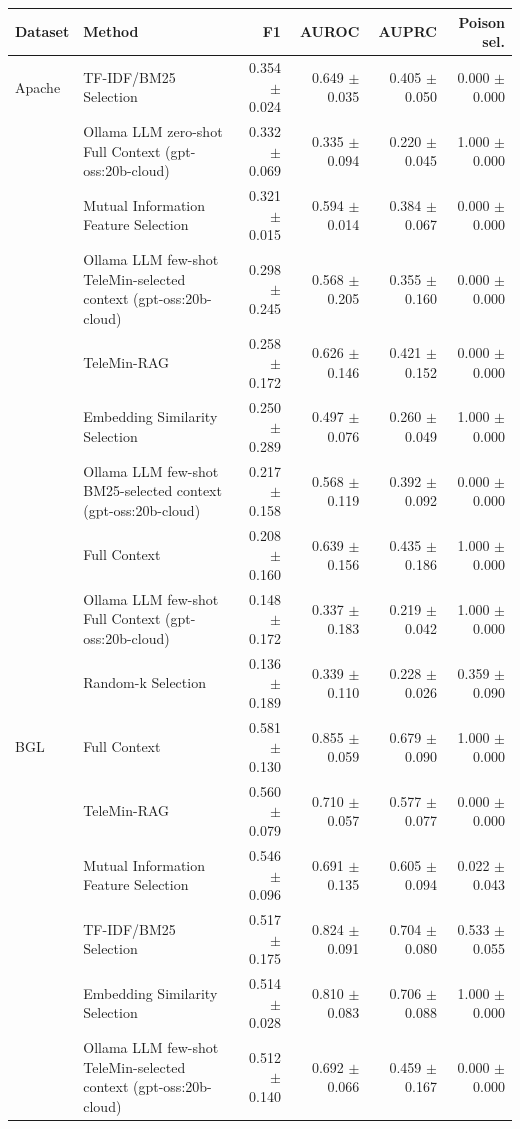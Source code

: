 \begin{tabular}{llrrrr}
\toprule
Dataset & Method & F1 & AUROC & AUPRC & Poison sel. \\
\midrule
Apache & TF-IDF/BM25 Selection & 0.354 $\pm$ 0.024 & 0.649 $\pm$ 0.035 & 0.405 $\pm$ 0.050 & 0.000 $\pm$ 0.000 \\
 & Ollama LLM zero-shot Full Context (gpt-oss:20b-cloud) & 0.332 $\pm$ 0.069 & 0.335 $\pm$ 0.094 & 0.220 $\pm$ 0.045 & 1.000 $\pm$ 0.000 \\
 & Mutual Information Feature Selection & 0.321 $\pm$ 0.015 & 0.594 $\pm$ 0.014 & 0.384 $\pm$ 0.067 & 0.000 $\pm$ 0.000 \\
 & Ollama LLM few-shot TeleMin-selected context (gpt-oss:20b-cloud) & 0.298 $\pm$ 0.245 & 0.568 $\pm$ 0.205 & 0.355 $\pm$ 0.160 & 0.000 $\pm$ 0.000 \\
 & TeleMin-RAG & 0.258 $\pm$ 0.172 & 0.626 $\pm$ 0.146 & 0.421 $\pm$ 0.152 & 0.000 $\pm$ 0.000 \\
 & Embedding Similarity Selection & 0.250 $\pm$ 0.289 & 0.497 $\pm$ 0.076 & 0.260 $\pm$ 0.049 & 1.000 $\pm$ 0.000 \\
 & Ollama LLM few-shot BM25-selected context (gpt-oss:20b-cloud) & 0.217 $\pm$ 0.158 & 0.568 $\pm$ 0.119 & 0.392 $\pm$ 0.092 & 0.000 $\pm$ 0.000 \\
 & Full Context & 0.208 $\pm$ 0.160 & 0.639 $\pm$ 0.156 & 0.435 $\pm$ 0.186 & 1.000 $\pm$ 0.000 \\
 & Ollama LLM few-shot Full Context (gpt-oss:20b-cloud) & 0.148 $\pm$ 0.172 & 0.337 $\pm$ 0.183 & 0.219 $\pm$ 0.042 & 1.000 $\pm$ 0.000 \\
 & Random-k Selection & 0.136 $\pm$ 0.189 & 0.339 $\pm$ 0.110 & 0.228 $\pm$ 0.026 & 0.359 $\pm$ 0.090 \\
\midrule
BGL & Full Context & 0.581 $\pm$ 0.130 & 0.855 $\pm$ 0.059 & 0.679 $\pm$ 0.090 & 1.000 $\pm$ 0.000 \\
 & TeleMin-RAG & 0.560 $\pm$ 0.079 & 0.710 $\pm$ 0.057 & 0.577 $\pm$ 0.077 & 0.000 $\pm$ 0.000 \\
 & Mutual Information Feature Selection & 0.546 $\pm$ 0.096 & 0.691 $\pm$ 0.135 & 0.605 $\pm$ 0.094 & 0.022 $\pm$ 0.043 \\
 & TF-IDF/BM25 Selection & 0.517 $\pm$ 0.175 & 0.824 $\pm$ 0.091 & 0.704 $\pm$ 0.080 & 0.533 $\pm$ 0.055 \\
 & Embedding Similarity Selection & 0.514 $\pm$ 0.028 & 0.810 $\pm$ 0.083 & 0.706 $\pm$ 0.088 & 1.000 $\pm$ 0.000 \\
 & Ollama LLM few-shot TeleMin-selected context (gpt-oss:20b-cloud) & 0.512 $\pm$ 0.140 & 0.692 $\pm$ 0.066 & 0.459 $\pm$ 0.167 & 0.000 $\pm$ 0.000 \\

\end{tabular}

